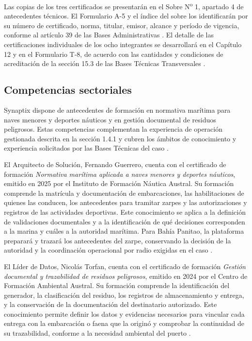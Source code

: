 Las copias de los tres certificados se presentarán en el Sobre N\textsuperscript{o} 1, apartado 4 de antecedentes técnicos. El Formulario A-5 y el índice del sobre los identificarán por su número de certificado, norma, titular, emisor, alcance y período de vigencia, conforme al artículo 39 de las Bases Administrativas \parencite[art.~39, numeral~4, p.~25]{bases-admin}. El detalle de las certificaciones individuales de los ocho integrantes se desarrollará en el Capítulo 12 y en el Formulario T-8, de acuerdo con las cantidades y condiciones de acreditación de la sección 15.3 de las Bases Técnicas Transversales \parencite[sec.~15.3, p.~28]{bases-transversales}.

\subsection{Competencias sectoriales}

Synaptix dispone de antecedentes de formación en normativa marítima para naves menores y deportes náuticos y en gestión documental de residuos peligrosos. Estas competencias complementan la experiencia de operación gestionada descrita en la sección 1.4.1 y cubren los ámbitos de conocimiento y experiencia solicitados por las Bases Técnicas del caso \parencite[cap.~15, certificaciones sectoriales del adjudicatario]{caso07}.

El Arquitecto de Solución, Fernando Guerrero, cuenta con el certificado de formación \textit{Normativa marítima aplicada a naves menores y deportes náuticos}, emitido en 2025 por el Instituto de Formación Náutica Austral. Su formación comprende la matrícula y documentación de embarcaciones, las habilitaciones de quienes las conducen, los antecedentes para tramitar zarpes y las autorizaciones y registros de las actividades deportivas. Este conocimiento se aplica a la definición de validaciones documentales y a la identificación de qué decisiones corresponden a la marina y cuáles a la autoridad marítima. Para Bahía Panitao, la plataforma preparará y trazará los antecedentes del zarpe, conservando la decisión de la autoridad y la coordinación operacional por radio exigidas en el caso \parencite[cap.~10, restricciones~4 y 5; cap.~12]{caso07}.

El Líder de Datos, Nicolás Torfan, cuenta con el certificado de formación \textit{Gestión documental y trazabilidad de residuos peligrosos}, emitido en 2024 por el Centro de Formación Ambiental Austral. Su formación comprende la identificación del generador, la clasificación del residuo, los registros de almacenamiento y entrega, y la conservación de la documentación del destinatario autorizado. Este conocimiento permite definir los datos y evidencias necesarios para vincular cada entrega con la embarcación o faena que la originó y comprobar la continuidad de su trazabilidad, conforme a la necesidad ambiental del puerto \parencite[cap.~12, residuos peligrosos]{caso07}.

